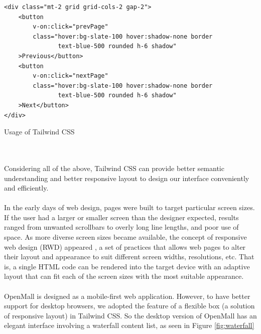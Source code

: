 \documentclass{article}
\begin{document}
\begin{listing}[!htp]
\begin{verbatim}
<div class="mt-2 grid grid-cols-2 gap-2">
    <button 
        v-on:click="prevPage" 
        class="hover:bg-slate-100 hover:shadow-none border 
               text-blue-500 rounded h-6 shadow"
    >Previous</button>
    <button 
        v-on:click="nextPage" 
        class="hover:bg-slate-100 hover:shadow-none border 
               text-blue-500 rounded h-6 shadow"
    >Next</button>
</div>
\end{verbatim}
\caption{Usage of Tailwind CSS}
\label{listing:tailwindcss}
\end{listing}

\leavevmode
\\\\
Considering all of the above, Tailwind CSS can provide better semantic understanding and better responsive layout to design our interface conveniently and efficiently.
\\\\
In the early days of web design, pages were built to target particular screen sizes. If the user had a larger or smaller screen than the designer expected, results ranged from unwanted scrollbars to overly long line lengths, and poor use of space. As more diverse screen sizes became available, the concept of responsive web design (RWD) appeared \cite{responsive}, a set of practices that allows web pages to alter their layout and appearance to suit different screen widths, resolutions, etc. That is, a single HTML code can be rendered into the target device with an adaptive layout that can fit each of the screen sizes with the most suitable appearance.
\\\\
OpenMall is designed as a mobile-first web application. However, to have better support for desktop browsers, we adopted the feature of a flexible box (a solution of responsive layout) in Tailwind CSS. So the desktop version of OpenMall has an elegant interface involving a waterfall content list, as seen in Figure \ref{fig:waterfall}
\end{document}

